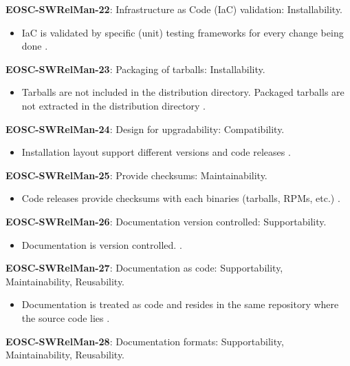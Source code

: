 \textbf{EOSC-SWRelMan-22}: Infrastructure as Code (IaC) validation: Installability.

\begin{itemize}
    \item IaC is validated by specific (unit) testing frameworks for every change being done \cite{orviz_fernandez_eosc-synergy_2020}.
\end{itemize}

\textbf{EOSC-SWRelMan-23}: Packaging of tarballs: Installability.

\begin{itemize}
    \item Tarballs are not included in the distribution directory. Packaged tarballs are not extracted in the distribution directory \cite{raymond_software_2013}.
\end{itemize}

\textbf{EOSC-SWRelMan-24}: Design for upgradability: Compatibility.

\begin{itemize}
    \item Installation layout support different versions and code releases \cite{raymond_software_2013}.
\end{itemize}

\textbf{EOSC-SWRelMan-25}: Provide checksums: Maintainability.

\begin{itemize}
    \item Code releases provide checksums with each binaries (tarballs, RPMs, etc.) \cite{raymond_software_2013}.
\end{itemize}

\textbf{EOSC-SWRelMan-26}: Documentation version controlled: Supportability.

\begin{itemize}
    \item Documentation is version controlled. \cite{orviz_fernandez_eosc-synergy_2020}.
\end{itemize}

\textbf{EOSC-SWRelMan-27}: Documentation as code: Supportability, Maintainability, Reusability.

\begin{itemize}
    \item Documentation is treated as code and resides in the same repository where the source code lies \cite{orviz_set_2017}.
\end{itemize}

\textbf{EOSC-SWRelMan-28}: Documentation formats: Supportability, Maintainability, Reusability.

